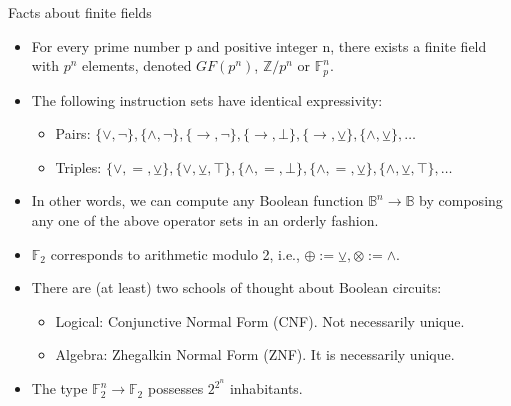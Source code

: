 \documentclass{beamer}
\begin{document}
    \begin{frame}{Facts about finite fields}
        \begin{itemize}
            \item For every prime number p and positive integer n, there exists a finite field with $p^n$ elements, denoted $GF(p^n)$, $\mathbb{Z}/p^n$ or $\mathbb{F}_p^n$.
            \item The following instruction sets have identical expressivity:
            \begin{itemize}
                \item Pairs: $\{\vee, \neg\}, \{\wedge, \neg\}, \{\to, \neg\}, \{\to, \bot\}, \{\to, \veebar\}, \{\land, \veebar\}, \ldots$
                \item Triples: $\{\lor, =, \veebar\}, \{\lor, \veebar, \top\}, \{\land, =, \bot\}, \{\land, =, \veebar\}, \{\land, \veebar, \top\}, \ldots$
            \end{itemize}
            \item In other words, we can compute any Boolean function $\mathbb{B}^n\rightarrow\mathbb{B}$ by composing any one of the above operator sets in an orderly fashion.
            \item $\mathbb{F}_2$ corresponds to arithmetic modulo 2, i.e., $\oplus := \veebar, \otimes := \land$.
            \item There are (at least) two schools of thought about Boolean circuits:
            \begin{itemize}
                \item Logical: Conjunctive Normal Form (CNF). Not necessarily unique.
                \item Algebra: Zhegalkin Normal Form (ZNF). It is necessarily unique.
            \end{itemize}
            \item The type $\mathbb{F}_2^n\rightarrow\mathbb{F}_2$ possesses $2^{2^{n}}$ inhabitants.
        \end{itemize}
    \end{frame}
\end{document}
